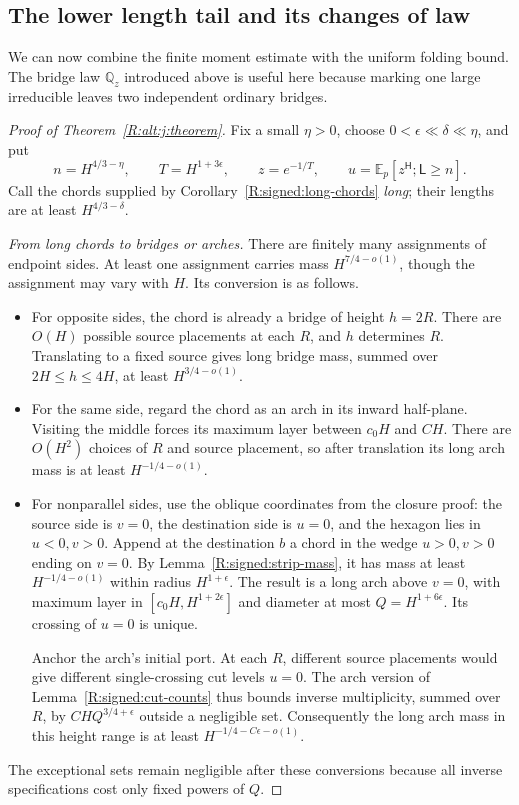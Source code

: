 \subsection{The lower length tail and its changes of law}

We can now combine the finite moment estimate with the uniform folding
bound. The bridge law $\mathbb Q_z$ introduced above is useful here because
marking one large irreducible leaves two independent ordinary bridges.

\begin{proof}[Proof of Theorem~\ref{R:alt:j:theorem}]
Fix a small $\eta>0$, choose $0<\epsilon\ll\delta\ll\eta$, and put
\[
 n=H^{4/3-\eta},\qquad T=H^{1+3\epsilon},\qquad z=e^{-1/T},
 \qquad u=\mathbb E_p[z^{\mathsf H};\mathsf L\ge n].
\]
Call the chords supplied by Corollary~\ref{R:signed:long-chords}
\emph{long}; their lengths are at least $H^{4/3-\delta}$.

\emph{From long chords to bridges or arches.}
There are finitely many assignments of endpoint sides. At least one
assignment carries mass $H^{7/4-o(1)}$, though the assignment may vary
with $H$. Its conversion is as follows.
\begin{itemize}
\item For opposite sides, the chord is already a bridge of height $h=2R$.
There are $O(H)$ possible source placements at each $R$, and $h$
determines $R$. Translating to a fixed source gives long bridge mass,
summed over $2H\le h\le4H$, at least $H^{3/4-o(1)}$.

\item For the same side, regard the chord as an arch in its inward
half-plane. Visiting the middle forces its maximum layer between $c_0H$
and $CH$. There are $O(H^2)$ choices of $R$ and source placement, so after
translation its long arch mass is at least $H^{-1/4-o(1)}$.

\item For nonparallel sides, use the oblique coordinates from the closure
proof: the source side is $v=0$, the destination side is $u=0$, and the
hexagon lies in $u<0,v>0$. Append at the destination $b$ a chord in the
wedge $u>0,v>0$ ending on $v=0$. By
Lemma~\ref{R:signed:strip-mass}, it has mass at least $H^{-1/4-o(1)}$
within radius $H^{1+\epsilon}$. The result is a long arch above $v=0$,
with maximum layer in $[c_0H,H^{1+2\epsilon}]$ and diameter at most
$Q=H^{1+6\epsilon}$. Its crossing of $u=0$ is unique.

Anchor the arch's initial port. At each $R$, different source placements
would give different single-crossing cut levels $u=0$. The arch version
of Lemma~\ref{R:signed:cut-counts} thus bounds inverse multiplicity,
summed over $R$, by $CHQ^{3/4+\epsilon}$ outside a negligible set.
Consequently the long arch mass in this height range is at least
$H^{-1/4-C\epsilon-o(1)}$.
\end{itemize}
The exceptional sets remain negligible after these conversions because
all inverse specifications cost only fixed powers of $Q$.


\end{proof}
